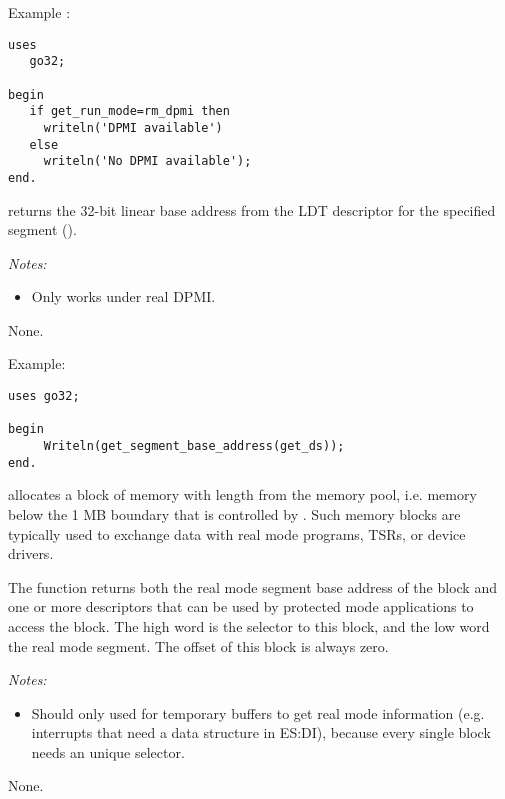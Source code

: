 {}
Example :
\begin{verbatim}
uses
   go32;

begin
   if get_run_mode=rm_dpmi then
     writeln('DPMI available')
   else
     writeln('No DPMI available');
end.
\end{verbatim}

{
 returns the 32-bit linear base address 
from the LDT descriptor for the specified segment ().


{\em Notes:}
\begin{itemize}
\item Only works under real DPMI.
\end{itemize}
}
{None.}
{}

\begin{FPCList}
\item[Example:]
\begin{verbatim}
uses go32;

begin
     Writeln(get_segment_base_address(get_ds));
end.
\end{verbatim}
\end{FPCList}


{
allocates a block of memory with length  from the \dos memory pool, 
i.e. memory below the 1 MB boundary that is controlled by \dos. 
Such memory blocks are typically used to exchange data with real mode 
programs, TSRs, or device drivers. 

The function returns both the real mode segment base address of
the block and one or more descriptors that can be used by protected mode
applications to access the block.
The high word is the selector to this block, and the low word the
\dos real mode segment. The offset of this block is always zero.

{\em Notes:}
\begin{itemize}
\item Should only used for temporary buffers to get real mode information
(e.g. interrupts that need a data structure in ES:DI), because every
single block needs an unique selector.
\end{itemize}
}{None.}{}

